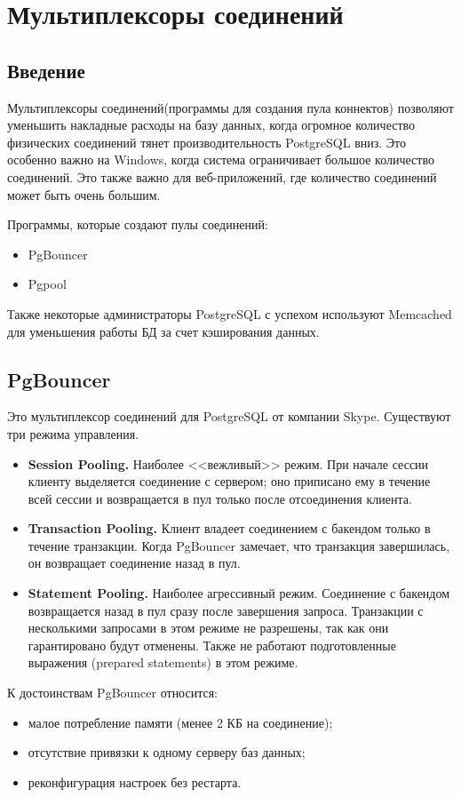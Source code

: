 \chapter{Мультиплексоры соединений}
\section{Введение}
Мультиплексоры соединений(программы для создания пула коннектов) позволяют уменьшить накладные расходы на базу данных, 
когда огромное количество физических соединений тянет производительность PostgreSQL вниз. 
Это особенно важно на Windows, когда система ограничивает большое количество соединений. 
Это также важно для веб-приложений, где количество соединений может быть очень большим.

Программы, которые создают пулы соединений:
\begin{itemize}
\item PgBouncer
\item Pgpool
\end{itemize}

Также некоторые администраторы PostgreSQL с успехом используют Memcached для уменьшения работы БД 
за счет кэширования данных.

\section{PgBouncer}
Это мультиплексор соединений для PostgreSQL от компании Skype. Существуют три режима управления.
\begin{itemize}
\item \textbf{Session Pooling.}
Наиболее <<вежливый>> режим. При начале сессии клиенту выделяется соединение с сервером; 
оно приписано ему в течение всей сессии и возвращается в пул только после отсоединения клиента. 
\item \textbf{Transaction Pooling.} 
Клиент владеет соединением с бакендом только в течение транзакции. Когда PgBouncer замечает, 
что транзакция завершилась, он возвращает соединение назад в пул. 
\item \textbf{Statement Pooling.} 
Наиболее агрессивный режим. Соединение с бакендом возвращается назад в пул сразу после завершения 
запроса. Транзакции с несколькими запросами в этом режиме не разрешены, так как они гарантировано будут отменены.
Также не работают подготовленные выражения (prepared statements) в этом режиме.
\end{itemize}

К достоинствам PgBouncer относится:
\begin{itemize}
\item малое потребление памяти (менее 2 КБ на соединение);
\item отсутствие привязки к одному серверу баз данных;
\item реконфигурация настроек без рестарта.
\end{itemize}

